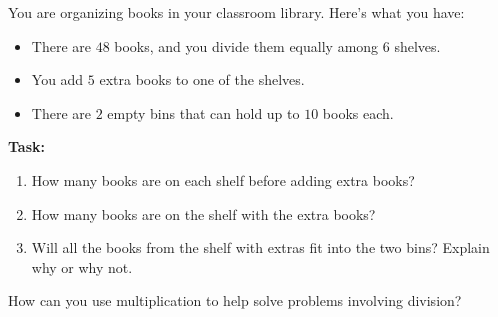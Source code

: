 \documentclass[12pt]{article}
\begin{document}
\begin{tcolorbox}[colframe=black!60, colback=white, 
coltitle=black, colbacktitle=black!15, fonttitle=\bfseries\Large, 
title=Performance Task: Organizing a Classroom Library, halign title=center, left=10pt, right=10pt, top=10pt, bottom=50pt]
You are organizing books in your classroom library. Here’s what you have:
\begin{itemize}
    \item There are \(48\) books, and you divide them equally among \(6\) shelves.
    \item You add \(5\) extra books to one of the shelves.
    \item There are \(2\) empty bins that can hold up to \(10\) books each.
\end{itemize}
\textbf{Task:}
\begin{enumerate}[itemsep=6em]
    \item How many books are on each shelf before adding extra books?
    \item How many books are on the shelf with the extra books?
    \item Will all the books from the shelf with extras fit into the two bins? Explain why or why not. 
    \vspace{4em}
   
\end{enumerate}
\end{tcolorbox}

\vspace{1em}

\begin{tcolorbox}[colframe=black!60, colback=white, 
coltitle=black, colbacktitle=black!15, fonttitle=\bfseries\Large, 
title=Reflection, halign title=center, left=10pt, right=10pt, top=10pt, bottom=100pt]
{How can you use multiplication to help solve problems involving division?}
\end{tcolorbox}
\end{document}

